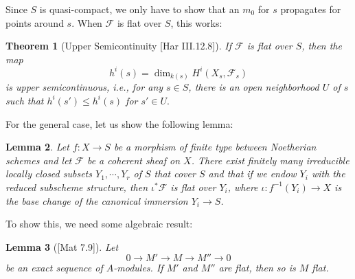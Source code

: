 \documentclass{article}
\theoremstyle{theorem}
\newtheorem{theorem}{Theorem}[section]
\newtheorem{lemma}[theorem]{Lemma}
\begin{document}
    Since $S$ is quasi-compact, we only have to show that an $m_0$ for $s$ propagates for points around $s$. When $\mathcal F$ is flat over $S$, this works:
    \newpage
    
    \begin{theorem} [Upper Semicontinuity {[}Har III.12.8{]}] \label{upper_semicontinuity}
        If $\mathcal F$ is flat over $S$, then the map
        $$h^i(s) = \dim_{k(s)} H^i(X_s, \mathcal F_s)$$ is upper semicontinuous, i.e., for any $s \in S$, there is an open neighborhood $U$ of $s$ such that $h^i(s') \leq h^i(s)$ for $s' \in U.$ 
    \end{theorem}
    
    For the general case, let us show the following lemma:
    
    \begin{lemma} \label{flat_decomposition}
        Let $f:X \rightarrow S$ be a morphism of finite type between Noetherian schemes and let $\mathcal F$ be a coherent sheaf on $X$. There exist finitely many irreducible locally closed subsets $Y_1, \cdots, Y_r$ of $S$ that cover $S$ and that if we endow $Y_i$ with the reduced subscheme structure, then $\iota^*\mathcal F$ is flat over $Y_i$, where $\iota : f^{-1}(Y_i) \rightarrow X$ is the base change of the canonical immersion $Y_i \rightarrow S$.
    \end{lemma}
    
    To show this, we need some algebraic result:
    
    \begin{lemma} [{[}Mat 7.9{]}] \label{flat_exact_sequence}
        Let $$0 \rightarrow M' \rightarrow M \rightarrow M'' \rightarrow 0$$ be an exact sequence of $A$-modules. If $M'$ and $M''$ are flat, then so is $M$ flat.
    \end{lemma}
    
\end{document}

